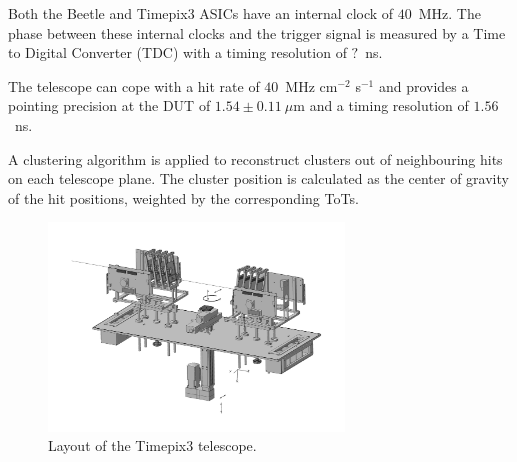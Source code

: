 Both the Beetle and Timepix3 ASICs have an internal clock of $40$~MHz.
The phase between these internal clocks and the trigger signal is measured by a Time to Digital Converter (TDC) with a timing resolution of $?$~ns.

The telescope can cope with a hit rate of $40$~MHz cm$^{-2}$ s$^{-1}$ and provides a pointing precision at the DUT of $1.54 \pm 0.11~\mu$m and a timing resolution of $1.56$~ns. 

A clustering algorithm is applied to reconstruct clusters out of neighbouring hits on each telescope plane. The cluster position is calculated as the center of gravity of the hit positions, weighted by the corresponding ToTs.

\begin{figure}[]
\centering
\includegraphics[width=0.7\textwidth]{figs/TelescopeNew.pdf}
\caption[Layout of the Timepix3 telescope.]{Layout of the Timepix3 telescope.}
\label{fig:Telescope}
\end{figure}